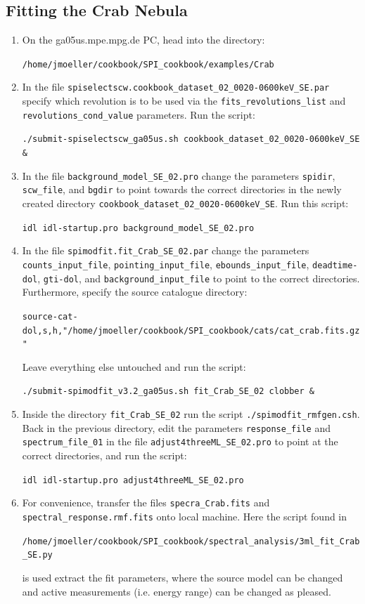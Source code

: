 \documentclass{article}
\begin{document}
\subsection{Fitting the Crab Nebula} \label{Spimodfit crab steps}

\begin{enumerate}
    \item On the ga05us.mpe.mpg.de PC, head into the directory:
    
    \verb|/home/jmoeller/cookbook/SPI_cookbook/examples/Crab|

    \item \label{scw select} In the file \verb|spiselectscw.cookbook_dataset_02_0020-0600keV_SE.par| specify which revolution is to be used via the \verb|fits_revolutions_list| and \verb|revolutions_cond_value| parameters. Run the script:
    
    \verb|./submit-spiselectscw_ga05us.sh cookbook_dataset_02_0020-0600keV_SE &|

    \item \label{step background} In the file \verb|background_model_SE_02.pro| change the parameters \verb|spidir|, \verb|scw_file|, and \verb|bgdir| to point towards the correct directories in the newly created directory \verb|cookbook_dataset_02_0020-0600keV_SE|. Run this script: 
    
    \verb|idl idl-startup.pro background_model_SE_02.pro|

    \item \label{Source directory} In the file \verb|spimodfit.fit_Crab_SE_02.par| change the parameters \verb|counts_input_file|, \verb|pointing_input_file|, \verb|ebounds_input_file|, \verb|deadtime-dol|, \verb|gti-dol|, and \verb|background_input_file| to point to the correct directories. Furthermore, specify the source catalogue directory:
    
    \verb|source-cat-dol,s,h,"/home/jmoeller/cookbook/SPI_cookbook/cats/cat_crab.fits.gz"|

    Leave everything else untouched and run the script:

    \verb|./submit-spimodfit_v3.2_ga05us.sh fit_Crab_SE_02 clobber &|

    \item \label{Spectrum file} Inside the directory \verb|fit_Crab_SE_02| run the script \verb|./spimodfit_rmfgen.csh|. Back in the previous directory, edit the parameters \verb|response_file| and \verb|spectrum_file_01| in the file \verb|adjust4threeML_SE_02.pro| to point at the correct directories, and run the script:
    
    \verb|idl idl-startup.pro adjust4threeML_SE_02.pro|

    \item For convenience, transfer the files \verb|specra_Crab.fits| and \verb|spectral_response.rmf.fits| onto local machine. Here the script found in
    
    \verb|/home/jmoeller/cookbook/SPI_cookbook/spectral_analysis/3ml_fit_Crab_SE.py|
    
    is used extract the fit parameters, where the source model can be changed and active measurements (i.e. energy range) can be changed as pleased.
\end{enumerate}
\end{document}
